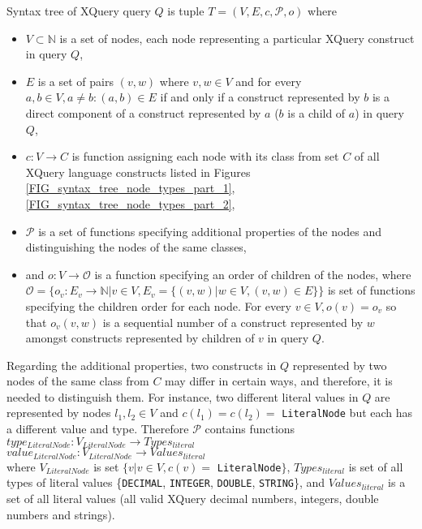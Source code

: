 \begin{define}
\label{DEF_syntax_tree}
Syntax tree of XQuery query $Q$ is tuple $T = (V, E, c, \mathcal{P}, o)$ where
\begin{itemize}
\item $V \subset \mathbb{N}$ is a set of nodes, each node representing a particular XQuery construct in query $Q$,
\item $E$ is a set of pairs $(v, w)$ where $v,w \in V$ and for every $a, b \in V, a \neq b: (a, b) \in E$ if and only if a construct represented by $b$ is a direct component of a construct represented by $a$ ($b$ is a child of $a$) in query $Q$,
\item $c: V \rightarrow C$ is function assigning each node with its class from set $C$ of all XQuery language constructs listed in Figures \ref{FIG_syntax_tree_node_types_part_1}, \ref{FIG_syntax_tree_node_types_part_2},
\item $\mathcal{P}$ is a set of functions specifying additional properties of the nodes and distinguishing the nodes of the same classes,
\item and $o : V \rightarrow \mathcal{O}$ is a function specifying an order of children of the nodes, where $\mathcal{O} = \{o_v : E_v \rightarrow \mathbb{N} | v \in V, E_v = \{(v, w) | w \in V, (v,w) \in E\}\}$ is set of functions specifying the children order for each node. For every $v \in V, o(v) = o_v$ so that $o_v(v,w)$ is a sequential number of a construct represented by $w$ amongst constructs represented by children of $v$ in query $Q$.
\end{itemize}
\end{define}

Regarding the additional properties, two constructs in $Q$ represented by two nodes of the same class from $C$ may differ in certain ways, and therefore, it is needed to distinguish them. For instance, two different literal values in $Q$ are represented by nodes $l_1, l_2 \in V$ and $c(l_1) = c(l_2) =$ \texttt{LiteralNode} but each has a different value and type. Therefore $\mathcal{P}$ contains functions \\
$type_{LiteralNode}: V_{LiteralNode} \rightarrow Types_{literal}$ \\
$value_{LiteralNode}: V_{LiteralNode} \rightarrow Values_{literal}$ \\
where $V_{LiteralNode}$ is set $\{v | v \in V, c(v) =$ \texttt{LiteralNode}$\}$, $Types_{literal}$ is set of all types of literal values \{\texttt{DECIMAL}, \texttt{INTEGER}, \texttt{DOUBLE}, \texttt{STRING}\}, and $Values_{literal}$ is a set of all literal values (all valid XQuery decimal numbers, integers, double numbers and strings).

